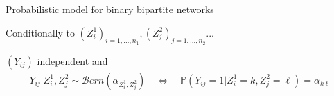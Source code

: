 \documentclass[compress,10pt]{beamer}
\begin{document}
\begin{frame}{Probabilistic model for binary  bipartite networks}


\begin{block}{Conditionally to $(Z^1_i)_{i=1,\dots,n_1},(Z^2_j)_{j=1,\dots,n_2}$... }

$(Y_{ij})$ independent and 
\begin{eqnarray*}
 Y_{ij}  | Z^1_i, Z^2_j \sim  \mathcal{B}ern(\alpha_{Z^1_i,Z^2_j}) \quad \Leftrightarrow \quad   \mathbb{P}(Y_{ij} = 1 | Z^1_i = k, Z^2_j = \ell)  =  \alpha_{k\ell}
\end{eqnarray*}
\end{block}
 

\textcolor{mygreen}{\cite{Govaert2008}}

\end{frame}

\end{document}
